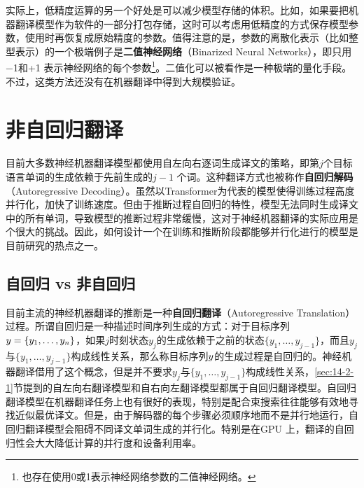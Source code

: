 \parinterval 实际上，低精度运算的另一个好处是可以减少模型存储的体积。比如，如果要把机器翻译模型作为软件的一部分打包存储，这时可以考虑用低精度的方式保存模型参数，使用时再恢复成原始精度的参数。值得注意的是，参数的离散化表示（比如整型表示）的一个极端例子是{\small\sffamily\bfseries{二值神经网络}}（Binarized Neural Networks），即只用−1和+1 表示神经网络的每个参数\footnote{也存在使用0或1表示神经网络参数的二值神经网络。}。二值化可以被看作是一种极端的量化手段。不过，这类方法还没有在机器翻译中得到大规模验证。

\sectionnewpage
\section{非自回归翻译}

\parinterval 目前大多数神经机器翻译模型都使用自左向右逐词生成译文的策略，即第$j$个目标语言单词的生成依赖于先前生成的$j-1$ 个词。这种翻译方式也被称作{\small\sffamily\bfseries{自回归解码}}（Autoregressive Decoding）。虽然以Transformer为代表的模型使得训练过程高度并行化，加快了训练速度。但由于推断过程自回归的特性，模型无法同时生成译文中的所有单词，导致模型的推断过程非常缓慢，这对于神经机器翻译的实际应用是个很大的挑战。因此，如何设计一个在训练和推断阶段都能够并行化进行的模型是目前研究的热点之一。


\subsection{自回归 vs 非自回归}

\parinterval 目前主流的神经机器翻译的推断是一种{\small\sffamily\bfseries{自回归翻译}}（Autoregressive Translation）过程。所谓自回归是一种描述时间序列生成的方式：对于目标序列${y}=\{y_1,\dots,y_n\}$，如果$j$时刻状态$y_j$的生成依赖于之前的状态$\{y_1,\dots,y_{j-1}\}$，而且$y_j$与$\{y_1,\dots,y_{j-1}\}$构成线性关系，那么称目标序列${y}$的生成过程是自回归的。神经机器翻译借用了这个概念，但是并不要求$y_j$与$\{y_1,\dots,y_{j-1}\}$构成线性关系，\ref{sec:14-2-1}节提到的自左向右翻译模型和自右向左翻译模型都属于自回归翻译模型。自回归翻译模型在机器翻译任务上也有很好的表现，特别是配合束搜索往往能够有效地寻找近似最优译文。但是，由于解码器的每个步骤必须顺序地而不是并行地运行，自回归翻译模型会阻碍不同译文单词生成的并行化。特别是在GPU 上，翻译的自回归性会大大降低计算的并行度和设备利用率。

